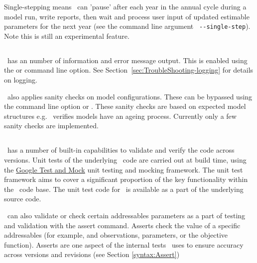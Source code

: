 Single-stepping means \CNAME\ can 'pause' after each year in the annual cycle during a model run, write reports, then wait and process user input of updated estimable parameters for the next year (see the command line argument \texttt{ -{}-single-step}). Note this is still an experimental feature.

\subsection{}\label{sec:LogandVerify}

\CNAME\ has an number of information and error message output. This is enabled using the  or  command line option. See Section~\ref{sec:TroubleShooting-logging} for details on logging. 


\CNAME\ also applies sanity checks on model configurations. These can be bypassed using the command line option  or . These sanity checks are based on expected model structures e.g. \CNAME\ verifies models have an ageing process. Currently only a few sanity checks are implemented.

\subsection{}\label{sec:Assert}

\CNAME\ has a number of built-in capabilities to validate and verify the code across versions. Unit tests of the underlying \CNAME\ code are carried out at build time, using the \href{https://github.com/google/googletest}{Google Test and Mock} unit testing and mocking framework. The unit test framework aims to cover a significant proportion of the key functionality within the \CNAME\ code base. The unit test code for \CNAME\ is available as a part of the underlying source code.

\CNAME\ can also validate or check certain addressables parameters as a part of testing and validation with the assert command. Asserts check the value of a specific addressables (for example, and observations, parameters, or the objective function). Asserts are one aspect of the internal tests \CNAME\ uses to ensure accuracy across versions and revisions (see Section \ref{syntax:Assert})

